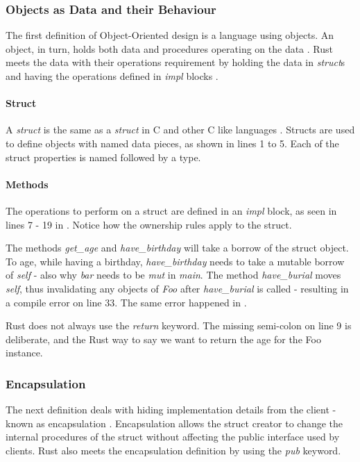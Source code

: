 \subsubsection{Objects as Data and their Behaviour}
The first definition of Object-Oriented design is a language using objects.
An object, in turn, holds both data and procedures operating on the data \cite{meyer_97_01,stefik_85_01,gamma_94_01}.
Rust meets the data with their operations requirement by holding the data in \textit{struct}s and having the operations defined in \textit{impl} blocks \cite{klabnik_2019_01}.

\paragraph{Struct}
A \textit{struct} is the same as a \textit{struct} in C \cite{stroustrup_13_01} and other C like languages \cite{robinson_04_01, savitch_15_01, malik_09_01}.
Structs are used to define objects with named data pieces, as shown in  lines 1 to 5.
Each of the struct properties is named followed by a type.


\paragraph{Methods}
The operations to perform on a struct are defined in an \textit{impl} block, as seen in lines 7 - 19 in .
Notice how the ownership rules apply to the struct.

The methods \textit{get\_age} and \textit{have\_birthday} will take a borrow of the struct object.
To age, while having a birthday, \textit{have\_birthday} needs to take a mutable borrow of \textit{self} - also why \textit{bar} needs to be \textit{mut} in \textit{main}.
The method \textit{have\_burial} moves \textit{self}, thus invalidating any objects of \textit{Foo} after \textit{have\_burial} is called - resulting in a compile error on line 33.
The same error happened in .

\begin{notebox}
	Rust does not always use the \textit{return} keyword.
	The missing semi-colon on line 9 is deliberate, and the Rust way to say we want to return the age for the Foo instance.
\end{notebox}

\subsubsection{Encapsulation}
The next definition deals with hiding implementation details from the client - known as encapsulation \cite{klabnik_2019_01, meyer_97_01}.
Encapsulation allows the struct creator to change the internal procedures of the struct without affecting the public interface used by clients.
Rust also meets the encapsulation definition by using the \textit{pub} keyword.

